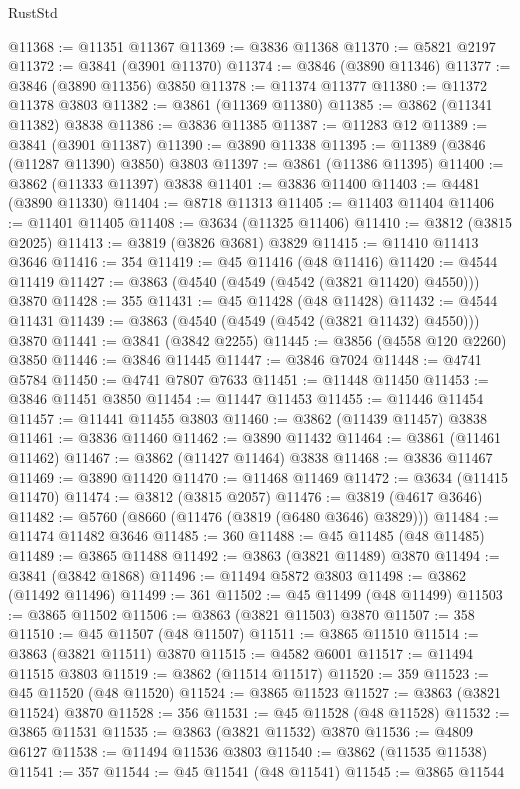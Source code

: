 \begin{lexlean}{RustStd}
\begin{coremodule}
@11368 := @11351 @11367
@11369 := @3836 @11368
@11370 := @5821 @2197
@11372 := @3841 (@3901 @11370)
@11374 := @3846 (@3890 @11346)
@11377 := @3846 (@3890 @11356) @3850
@11378 := @11374 @11377
@11380 := @11372 @11378 @3803
@11382 := @3861 (@11369 @11380)
@11385 := @3862 (@11341 @11382) @3838
@11386 := @3836 @11385
@11387 := @11283 @12
@11389 := @3841 (@3901 @11387)
@11390 := @3890 @11338
@11395 := @11389 (@3846 (@11287 @11390) @3850) @3803
@11397 := @3861 (@11386 @11395)
@11400 := @3862 (@11333 @11397) @3838
@11401 := @3836 @11400
@11403 := @4481 (@3890 @11330)
@11404 := @8718 @11313
@11405 := @11403 @11404
@11406 := @11401 @11405
@11408 := @3634 (@11325 @11406)
@11410 := @3812 (@3815 @2025)
@11413 := @3819 (@3826 @3681) @3829
@11415 := @11410 @11413 @3646
@11416 := 354
@11419 := @45 @11416 (@48 @11416)
@11420 := @4544 @11419
@11427 := @3863 (@4540 (@4549 (@4542 (@3821 @11420) @4550))) @3870
@11428 := 355
@11431 := @45 @11428 (@48 @11428)
@11432 := @4544 @11431
@11439 := @3863 (@4540 (@4549 (@4542 (@3821 @11432) @4550))) @3870
@11441 := @3841 (@3842 @2255)
@11445 := @3856 (@4558 @120 @2260) @3850
@11446 := @3846 @11445
@11447 := @3846 @7024
@11448 := @4741 @5784
@11450 := @4741 @7807 @7633
@11451 := @11448 @11450
@11453 := @3846 @11451 @3850
@11454 := @11447 @11453
@11455 := @11446 @11454
@11457 := @11441 @11455 @3803
@11460 := @3862 (@11439 @11457) @3838
@11461 := @3836 @11460
@11462 := @3890 @11432
@11464 := @3861 (@11461 @11462)
@11467 := @3862 (@11427 @11464) @3838
@11468 := @3836 @11467
@11469 := @3890 @11420
@11470 := @11468 @11469
@11472 := @3634 (@11415 @11470)
@11474 := @3812 (@3815 @2057)
@11476 := @3819 (@4617 @3646)
@11482 := @5760 (@8660 (@11476 (@3819 (@6480 @3646) @3829)))
@11484 := @11474 @11482 @3646
@11485 := 360
@11488 := @45 @11485 (@48 @11485)
@11489 := @3865 @11488
@11492 := @3863 (@3821 @11489) @3870
@11494 := @3841 (@3842 @1868)
@11496 := @11494 @5872 @3803
@11498 := @3862 (@11492 @11496)
@11499 := 361
@11502 := @45 @11499 (@48 @11499)
@11503 := @3865 @11502
@11506 := @3863 (@3821 @11503) @3870
@11507 := 358
@11510 := @45 @11507 (@48 @11507)
@11511 := @3865 @11510
@11514 := @3863 (@3821 @11511) @3870
@11515 := @4582 @6001
@11517 := @11494 @11515 @3803
@11519 := @3862 (@11514 @11517)
@11520 := 359
@11523 := @45 @11520 (@48 @11520)
@11524 := @3865 @11523
@11527 := @3863 (@3821 @11524) @3870
@11528 := 356
@11531 := @45 @11528 (@48 @11528)
@11532 := @3865 @11531
@11535 := @3863 (@3821 @11532) @3870
@11536 := @4809 @6127
@11538 := @11494 @11536 @3803
@11540 := @3862 (@11535 @11538)
@11541 := 357
@11544 := @45 @11541 (@48 @11541)
@11545 := @3865 @11544

\end{coremodule}
\end{lexlean}
